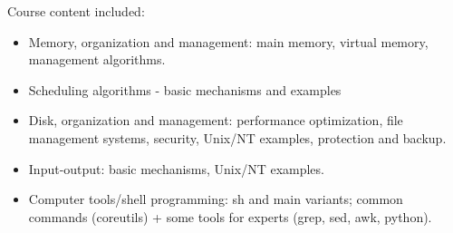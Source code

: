 Course content included:
\begin{itemize}
    \item Memory, organization and management: main memory, virtual memory, management algorithms.
    \item Scheduling algorithms - basic mechanisms and examples
    \item Disk, organization and management: performance optimization, file management systems, security, Unix/NT examples, protection and backup.
    \item Input-output: basic mechanisms, Unix/NT examples.
    \item Computer tools/shell programming: sh and main variants; common commands (coreutils) + some tools for experts (grep, sed, awk, python).
\end{itemize}